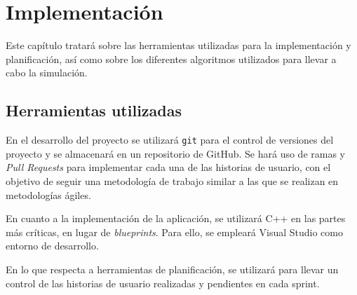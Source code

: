 \chapter{Implementación}


Este capítulo tratará sobre las herramientas utilizadas para la implementación y planificación, así como sobre los diferentes algoritmos utilizados para llevar a cabo la simulación.

\section{Herramientas utilizadas}
En el desarrollo del proyecto se utilizará \verb|git| para el control de versiones del proyecto y se almacenará en un repositorio de GitHub. Se hará uso de ramas y \textit{Pull Requests} para implementar cada una de las historias de usuario, con el objetivo de seguir una metodología de trabajo similar a las que se realizan en metodologías ágiles.


\bigskip

En cuanto a la implementación de la aplicación, se utilizará C++ en las partes más críticas, en lugar de \textit{blueprints}. Para ello, se empleará Visual Studio como entorno de desarrollo.

\bigskip

En lo que respecta a herramientas de planificación, se utilizará \planApp para llevar un control de las historias de usuario realizadas y pendientes en cada sprint.

